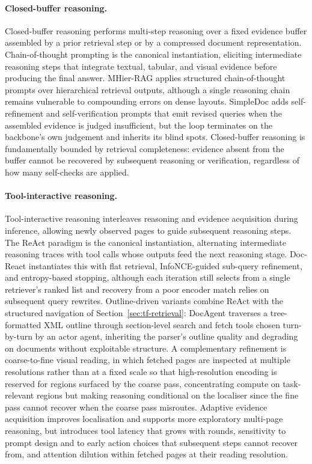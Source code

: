 \documentclass[11pt]{article}
\begin{document}
\paragraph{Closed-buffer reasoning.} Closed-buffer reasoning performs multi-step reasoning over a fixed evidence buffer assembled by a prior retrieval step or by a compressed document representation. Chain-of-thought prompting \cite{wei2022chainofthought} is the canonical instantiation, eliciting intermediate reasoning steps that integrate textual, tabular, and visual evidence before producing the final answer. MHier-RAG \cite{gong2025mhierrag} applies structured chain-of-thought prompts over hierarchical retrieval outputs, although a single reasoning chain remains vulnerable to compounding errors on dense layouts. SimpleDoc \cite{jain2025simpledoc} adds self-refinement and self-verification prompts that emit revised queries when the assembled evidence is judged insufficient, but the loop terminates on the backbone's own judgement and inherits its blind spots. Closed-buffer reasoning is fundamentally bounded by retrieval completeness: evidence absent from the buffer cannot be recovered by subsequent reasoning or verification, regardless of how many self-checks are applied.

\paragraph{Tool-interactive reasoning.} Tool-interactive reasoning interleaves reasoning and evidence acquisition during inference, allowing newly observed pages to guide subsequent reasoning steps. The ReAct paradigm \cite{yao2022react} is the canonical instantiation, alternating intermediate reasoning traces with tool calls whose outputs feed the next reasoning stage. Doc-React \cite{wu2025docreact} instantiates this with flat retrieval, InfoNCE-guided sub-query refinement, and entropy-based stopping, although each iteration still selects from a single retriever's ranked list and recovery from a poor encoder match relies on subsequent query rewrites. Outline-driven variants combine ReAct with the structured navigation of Section~\ref{sec:tf-retrieval}: DocAgent \cite{sun2025docagent} traverses a tree-formatted XML outline through section-level search and fetch tools chosen turn-by-turn by an actor agent, inheriting the parser's outline quality and degrading on documents without exploitable structure. A complementary refinement is coarse-to-fine visual reading, in which fetched pages are inspected at multiple resolutions rather than at a fixed scale so that high-resolution encoding is reserved for regions surfaced by the coarse pass, concentrating compute on task-relevant regions but making reasoning conditional on the localiser since the fine pass cannot recover when the coarse pass misroutes. Adaptive evidence acquisition improves localisation and supports more exploratory multi-page reasoning, but introduces tool latency that grows with rounds, sensitivity to prompt design and to early action choices that subsequent steps cannot recover from, and attention dilution within fetched pages at their reading resolution.
\end{document}
